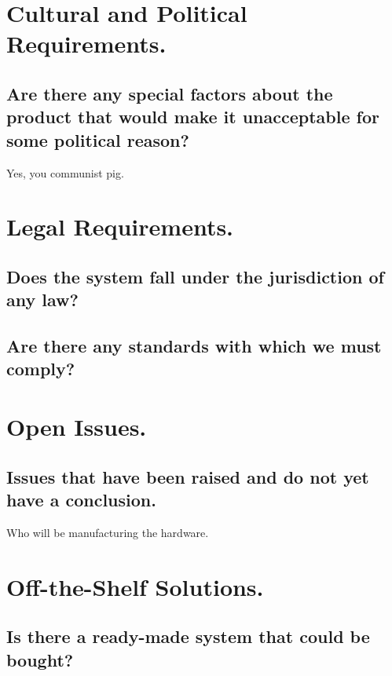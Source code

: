 \NA

\section{Cultural and Political Requirements.}

\subsection{Are there any special factors about the product that would make it unacceptable for some political reason?}

Yes, you communist pig.

\section{Legal Requirements.}

\subsection{Does the system fall under the jurisdiction of any law?}

\NA

\subsection{Are there any standards with which we must comply?}

\NA


\section{Open Issues.}

\subsection{Issues that have been raised and do not yet have a conclusion.}

Who will be manufacturing the hardware.

\section{Off-the-Shelf Solutions.}

\subsection{Is there a ready-made system that could be bought?}

